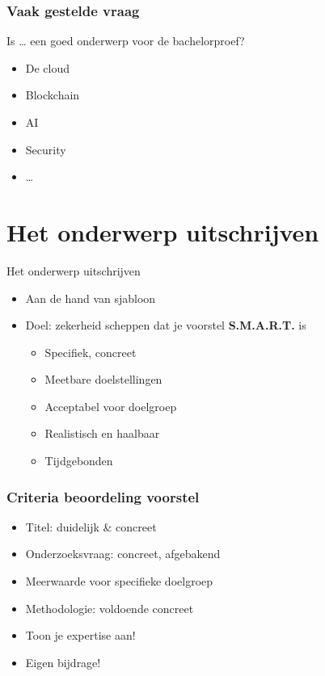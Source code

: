 \documentclass[aspectratio=169]{beamer}
\begin{document}
\begin{frame}[plain]
  \frametitle{Vaak gestelde vraag}

  Is \ldots{} een goed onderwerp voor de bachelorproef?

  \begin{itemize}
    \item De cloud
    \item Blockchain
    \item AI
    \item Security
    \item \ldots
  \end{itemize}

  \bigskip

\end{frame}

\section{Het onderwerp uitschrijven}

\begin{frame}{Het onderwerp uitschrijven}

  \begin{itemize}
    \item Aan de hand van sjabloon
    \item Doel: zekerheid scheppen dat je voorstel \textbf{S.M.A.R.T.} is
          \begin{itemize}
            \item Specifiek, concreet
            \item Meetbare doelstellingen
            \item Acceptabel voor doelgroep
            \item Realistisch en haalbaar
            \item Tijdgebonden
          \end{itemize}
  \end{itemize}
\end{frame}

\begin{frame}
  \frametitle{Criteria beoordeling voorstel}

  \begin{itemize}
    \item Titel: duidelijk \& concreet
    \item Onderzoeksvraag: concreet, afgebakend
    \item Meerwaarde voor specifieke doelgroep
    \item Methodologie: voldoende concreet
    \item Toon je expertise aan!
    \item Eigen bijdrage!
  \end{itemize}

\end{frame}
\end{document}
